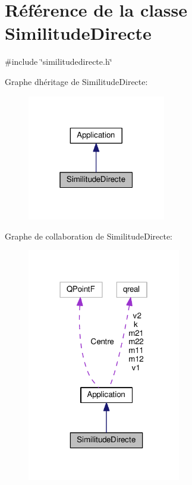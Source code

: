 \hypertarget{class_similitude_directe}{}\section{Référence de la classe Similitude\+Directe}
\label{class_similitude_directe}


{\ttfamily \#include \char`\"{}similitudedirecte.\+h\char`\"{}}



Graphe d\textquotesingle{}héritage de Similitude\+Directe\+:\nopagebreak
\begin{figure}[H]
\begin{center}
\leavevmode
\includegraphics[width=171pt]{class_similitude_directe__inherit__graph}
\end{center}
\end{figure}


Graphe de collaboration de Similitude\+Directe\+:\nopagebreak
\begin{figure}[H]
\begin{center}
\leavevmode
\includegraphics[width=190pt]{class_similitude_directe__coll__graph}
\end{center}
\end{figure}
